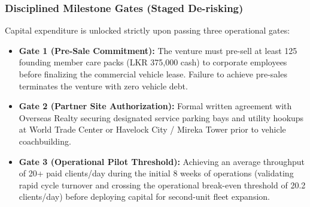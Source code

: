 \subsubsection{Disciplined Milestone Gates (Staged De-risking)}
Capital expenditure is unlocked strictly upon passing three operational gates:
\begin{itemize}[leftmargin=1.5em, itemsep=0.15em]
    \item \textbf{Gate 1 (Pre-Sale Commitment):} The venture must pre-sell at least 125 founding member care packs (LKR 375,000 cash) to corporate employees before finalizing the commercial vehicle lease. Failure to achieve pre-sales terminates the venture with zero vehicle debt.
    \item \textbf{Gate 2 (Partner Site Authorization):} Formal written agreement with Overseas Realty securing designated service parking bays and utility hookups at World Trade Center or Havelock City / Mireka Tower prior to vehicle coachbuilding.
    \item \textbf{Gate 3 (Operational Pilot Threshold):} Achieving an average throughput of 20+ paid clients/day during the initial 8 weeks of operations (validating rapid cycle turnover and crossing the operational break-even threshold of 20.2 clients/day) before deploying capital for second-unit fleet expansion.
\end{itemize}
